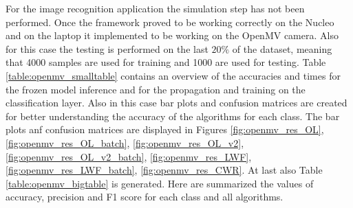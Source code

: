 \documentclass[12pt]{report}
\begin{document}
For the image recognition application the simulation step has not been performed. Once the framework proved to be working correctly on the Nucleo and on the laptop it implemented to be working on the OpenMV camera. Also for this case the testing is performed on the last $20 \%$ of the dataset, meaning that 4000 samples are used for training and 1000 are used for testing. Table \ref{table:openmv_smalltable} contains an overview of the accuracies and times for the frozen model inference and for the propagation and training on the classification layer. Also in this case bar plots and confusion matrices are created for better understanding the accuracy of the algorithms for each class. The bar plots anf confusion matrices are displayed in Figures \ref{fig:openmv_res_OL}, \ref{fig:openmv_res_OL_batch}, \ref{fig:openmv_res_OL_v2}, \ref{fig:openmv_res_OL_v2_batch}, \ref{fig:openmv_res_LWF}, \ref{fig:openmv_res_LWF_batch}, \ref{fig:openmv_res_CWR}. At last also Table \ref{table:openmv_bigtable} is generated. Here are summarized the values of accuracy, precision and F1 score for each class and all algorithms. 
\end{document}
